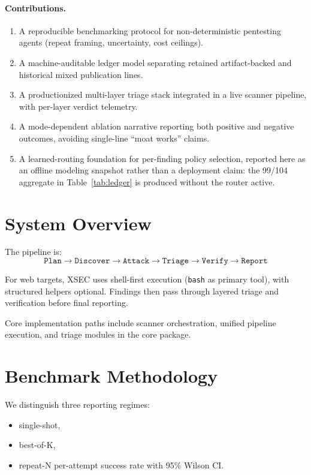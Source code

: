 \documentclass[11pt]{article}
\begin{document}
\paragraph{Contributions.}
\begin{enumerate}[leftmargin=*,itemsep=2pt]
  \item A reproducible benchmarking protocol for non-deterministic pentesting
  agents (repeat framing, uncertainty, cost ceilings).
  \item A machine-auditable ledger model separating retained artifact-backed and
  historical mixed publication lines.
  \item A productionized multi-layer triage stack integrated in a live scanner
  pipeline, with per-layer verdict telemetry.
  \item A mode-dependent ablation narrative reporting both positive and negative
  outcomes, avoiding single-line ``moat works'' claims.
  \item A learned-routing foundation for per-finding policy selection,
  reported here as an offline modeling snapshot rather than a deployment
  claim: the 99/104 aggregate in Table~\ref{tab:ledger} is produced
  without the router active.
\end{enumerate}

\section{System Overview}

The pipeline is:
\[
\texttt{Plan} \rightarrow \texttt{Discover} \rightarrow \texttt{Attack} \rightarrow \texttt{Triage} \rightarrow \texttt{Verify} \rightarrow \texttt{Report}
\]

For web targets, XSEC uses shell-first execution (\texttt{bash} as primary
tool), with structured helpers optional. Findings then pass through layered
triage and verification before final reporting.

Core implementation paths include scanner orchestration, unified pipeline
execution, and triage modules in the core package.

\section{Benchmark Methodology}

We distinguish three reporting regimes:
\begin{itemize}
  \item single-shot,
  \item best-of-K,
  \item repeat-N per-attempt success rate with 95\% Wilson CI.
\end{itemize}
\end{document}
